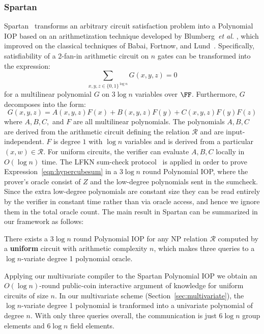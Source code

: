 
\subsubsection{Spartan}
\textsf{Spartan}~\cite{Spartan} transforms an arbitrary circuit satisfaction problem into a Polynomial IOP based on an arithmetization technique developed by Blumberg~\emph{et al.} \cite{EPRINT:BTVW14}, which improved on the classical techniques of Babai, Fortnow, and Lund~\cite{BFL}. Specifically, satisfiability of a 2-fan-in arithmetic circuit on $n$ gates can be transformed into the expression: 
\begin{equation}\label{eqn:hypercubesum}
\sum_{x, y, z \in \{0,1\}^{\log n}} G(x, y, z) = 0
\end{equation} 
for a multilinear polynomial $G$ on $3 \log n$ variables over $\FF$. 
Furthermore, $G$ decomposes into the form: 
$$G(x,y,z) = A(x,y,z) F(x) + B(x, y, z) F(y) + C(x, y, z) F(y) F(z)$$
where $A, B, C,$ and $F$ are all multilinear polynomials. The polynomials $A, B, C$ are derived from the arithmetic circuit defining the relation $\mathcal{R}$ and are input-independent. $F$ is degree $1$ with $\log n$ variables and is derived from a particular $(x, w) \in \mathcal{R}$. For uniform circuits, the verifier can evaluate $A, B, C$ locally in $O(\log n )$ time. The LFKN sum-check protocol~\cite{FOCS:LFKN90} is applied in order to prove Expression~\ref{eqn:hypercubesum} in a $3\log n$ round Polynomial IOP, where the prover's oracle consist of $Z$ and the low-degree polynomials sent in the sumcheck. Since the extra low-degree polynomials are constant size they can be read entirely by the verifier in constant time rather than via oracle access, and hence we ignore them in the total oracle count. The main result in Spartan can be summarized in our framework as follows: 

\begin{theorem}[Setty19]
There exists a $3 \log n$ round Polynomial IOP for any NP relation $\mathcal{R}$ computed by a \textbf{uniform} circuit with arithmetic complexity $n$, which makes three queries to a $\log n$-variate degree 1 polynomial oracle.  
\end{theorem}

Applying our multivariate compiler to the \textsf{Spartan} Polynomial IOP we obtain an $O(\log n)$-round public-coin interactive argument of knowledge for uniform circuits of size $n$. In our multivariate scheme (Section~\ref{sec:multivariate}), the $\log n$-variate degree 1 polynomial is tranformed into a univariate polynomial of degree $n$. With only three queries overall, the communication is just $6 \log n$ group elements and $6 \log n$ field elements. 


